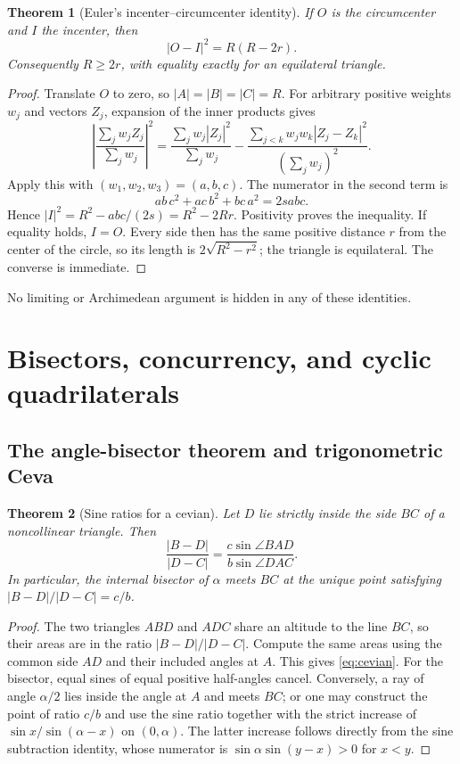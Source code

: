 \documentclass[11pt]{article}
\numberwithin{equation}{section}
\newtheorem{theorem}{Theorem}[section]
\theoremstyle{definition}
\begin{document}
\begin{theorem}[Euler's incenter--circumcenter identity]\label{thm:euler}
If $O$ is the circumcenter and $I$ the incenter, then
\begin{equation}\label{eq:euler}
 |O-I|^2=R(R-2r).
\end{equation}
Consequently $R\ge2r$, with equality exactly for an equilateral triangle.
\end{theorem}
\begin{proof}
Translate $O$ to zero, so $|A|=|B|=|C|=R$. For arbitrary positive weights $w_j$ and vectors $Z_j$, expansion of the inner products gives
\[
 \left|\frac{\sum_jw_jZ_j}{\sum_jw_j}\right|^2
 =\frac{\sum_jw_j|Z_j|^2}{\sum_jw_j}
 -\frac{\sum_{j<k}w_jw_k|Z_j-Z_k|^2}{(\sum_jw_j)^2}.
\]
Apply this with $(w_1,w_2,w_3)=(a,b,c)$. The numerator in the second term is
\[
 ab\,c^2+ac\,b^2+bc\,a^2=2sabc.
\]
Hence $|I|^2=R^2-abc/(2s)=R^2-2Rr$. Positivity proves the inequality. If equality holds, $I=O$. Every side then has the same positive distance $r$ from the center of the circle, so its length is $2\sqrt{R^2-r^2}$; the triangle is equilateral. The converse is immediate.
\end{proof}
No limiting or Archimedean argument is hidden in any of these identities.

\section{Bisectors, concurrency, and cyclic quadrilaterals}\label{sec:incidence}
\subsection{The angle-bisector theorem and trigonometric Ceva}
\begin{theorem}[Sine ratios for a cevian]\label{thm:cevian}
Let $D$ lie strictly inside the side $BC$ of a noncollinear triangle. Then
\begin{equation}\label{eq:cevian}
 \frac{|B-D|}{|D-C|}
 =\frac{c\sin\angle BAD}{b\sin\angle DAC}.
\end{equation}
In particular, the internal bisector of $\alpha$ meets $BC$ at the unique point satisfying $|B-D|/|D-C|=c/b$.
\end{theorem}
\begin{proof}
The two triangles $ABD$ and $ADC$ share an altitude to the line $BC$, so their areas are in the ratio $|B-D|/|D-C|$. Compute the same areas using the common side $AD$ and their included angles at $A$. This gives \eqref{eq:cevian}. For the bisector, equal sines of equal positive half-angles cancel. Conversely, a ray of angle $\alpha/2$ lies inside the angle at $A$ and meets $BC$; or one may construct the point of ratio $c/b$ and use the sine ratio together with the strict increase of $\sin x/\sin(\alpha-x)$ on $(0,\alpha)$. The latter increase follows directly from the sine subtraction identity, whose numerator is $\sin\alpha\sin(y-x)>0$ for $x<y$.
\end{proof}
\end{document}
